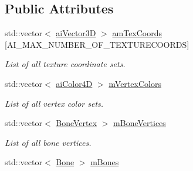 \subsection*{Public Attributes}
\begin{DoxyCompactItemize}
\item 
\hypertarget{struct_assimp_1_1_a_s_e_1_1_mesh_aa2aab9143a635010a6e360eee19d175d}{std\+::vector$<$ \hyperlink{structai_vector3_d}{ai\+Vector3\+D} $>$ \hyperlink{struct_assimp_1_1_a_s_e_1_1_mesh_aa2aab9143a635010a6e360eee19d175d}{am\+Tex\+Coords} \mbox{[}A\+I\+\_\+\+M\+A\+X\+\_\+\+N\+U\+M\+B\+E\+R\+\_\+\+O\+F\+\_\+\+T\+E\+X\+T\+U\+R\+E\+C\+O\+O\+R\+D\+S\mbox{]}}\label{struct_assimp_1_1_a_s_e_1_1_mesh_aa2aab9143a635010a6e360eee19d175d}

\begin{DoxyCompactList}\small\item\em List of all texture coordinate sets. \end{DoxyCompactList}\item 
\hypertarget{struct_assimp_1_1_a_s_e_1_1_mesh_adba07d63e3bfe1ea0f9a0f316a1155c2}{std\+::vector$<$ \hyperlink{structai_color4_d}{ai\+Color4\+D} $>$ \hyperlink{struct_assimp_1_1_a_s_e_1_1_mesh_adba07d63e3bfe1ea0f9a0f316a1155c2}{m\+Vertex\+Colors}}\label{struct_assimp_1_1_a_s_e_1_1_mesh_adba07d63e3bfe1ea0f9a0f316a1155c2}

\begin{DoxyCompactList}\small\item\em List of all vertex color sets. \end{DoxyCompactList}\item 
\hypertarget{struct_assimp_1_1_a_s_e_1_1_mesh_adb9de6490bc46813c6ed2bfa2f372ac3}{std\+::vector$<$ \hyperlink{struct_assimp_1_1_a_s_e_1_1_bone_vertex}{Bone\+Vertex} $>$ \hyperlink{struct_assimp_1_1_a_s_e_1_1_mesh_adb9de6490bc46813c6ed2bfa2f372ac3}{m\+Bone\+Vertices}}\label{struct_assimp_1_1_a_s_e_1_1_mesh_adb9de6490bc46813c6ed2bfa2f372ac3}

\begin{DoxyCompactList}\small\item\em List of all bone vertices. \end{DoxyCompactList}\item 
\hypertarget{struct_assimp_1_1_a_s_e_1_1_mesh_a5b09ffff1204fa1acf8e5322c843f29f}{std\+::vector$<$ \hyperlink{struct_assimp_1_1_a_s_e_1_1_bone}{Bone} $>$ \hyperlink{struct_assimp_1_1_a_s_e_1_1_mesh_a5b09ffff1204fa1acf8e5322c843f29f}{m\+Bones}}\label{struct_assimp_1_1_a_s_e_1_1_mesh_a5b09ffff1204fa1acf8e5322c843f29f}


\end{DoxyCompactItemize}
